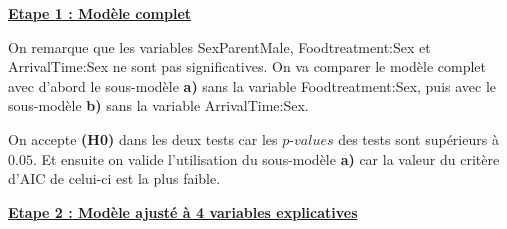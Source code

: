\documentclass[11pt,fleqn]{book} %
\begin{document}
	\underline{\textbf{Etape 1 : Modèle complet}}
	
	\vspace{2em}
	
	
	\vspace{2em}
	
	
	\vspace{1em}
	
	On remarque que les variables SexParentMale, Foodtreatment:Sex et ArrivalTime:Sex ne sont pas significatives. On va comparer le modèle complet avec d'abord le sous-modèle \textbf{a)} sans la variable Foodtreatment:Sex, puis avec le sous-modèle  \textbf{b)} sans la variable ArrivalTime:Sex. 
	
	\vspace{2em}
	
	
	\vspace{2em}
	
	
	\vspace{1em}
	
	On accepte \textbf{(H0)} dans les deux tests car les $p$-$values$ des tests sont supérieurs à $0.05$. Et ensuite on valide l'utilisation du sous-modèle \textbf{a)} car la valeur du critère d'AIC de celui-ci est la plus faible.
	
	\vspace{1em}
	
	\underline{\textbf{Etape 2 : Modèle ajusté à 4 variables explicatives}}
	
\end{document}
